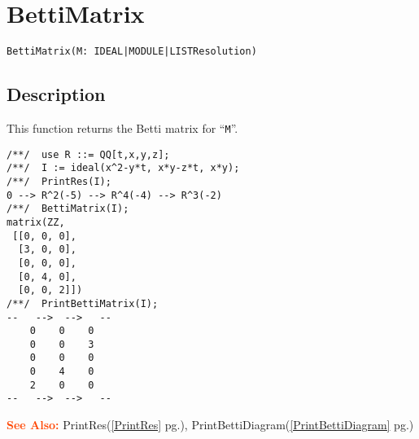 \documentclass[a4paper]{mybook}
\newenvironment{command}{}{} %
\newcommand\SeeAlso{\par\textcolor{OrangeRed}{\textbf{\large See Also: }}}
\begin{document}
\section{BettiMatrix}
\label{BettiMatrix}
\begin{command} %


\begin{Verbatim}[label=syntax, rulecolor=\color{MidnightBlue},
frame=single]
BettiMatrix(M: IDEAL|MODULE|LISTResolution)
\end{Verbatim}


\subsection*{Description}

This function returns the Betti matrix for ``\verb&M&''.
\begin{Verbatim}[label=example, rulecolor=\color{PineGreen}, frame=single]
/**/  use R ::= QQ[t,x,y,z];
/**/  I := ideal(x^2-y*t, x*y-z*t, x*y);
/**/  PrintRes(I);
0 --> R^2(-5) --> R^4(-4) --> R^3(-2)
/**/  BettiMatrix(I);
matrix(ZZ,
 [[0, 0, 0],
  [3, 0, 0],
  [0, 0, 0],
  [0, 4, 0],
  [0, 0, 2]])
/**/  PrintBettiMatrix(I);
--   -->  -->   --
    0    0    0
    0    0    3
    0    0    0
    0    4    0
    2    0    0
--   -->  -->   --
\end{Verbatim}


\SeeAlso %
  PrintRes(\ref{PrintRes} pg.\pageref{PrintRes}), 
    PrintBettiDiagram(\ref{PrintBettiDiagram} pg.\pageref{PrintBettiDiagram})
\end{command} %
\end{document}
